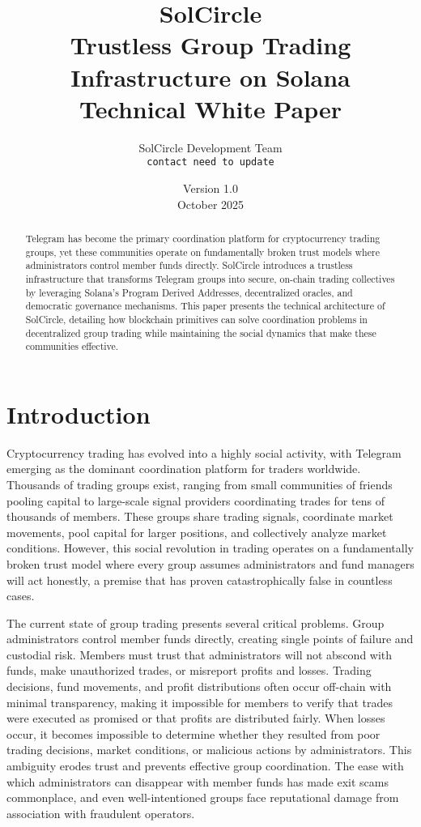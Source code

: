 \documentclass[11pt,a4paper]{article}
\title{\textbf{\Huge SolCircle} \\[0.5em] 
\Large Trustless Group Trading Infrastructure on Solana \\[1em]
\large Technical White Paper}
\author{
SolCircle Development Team \\
\texttt{contact need to update}
}
\date{Version 1.0 \\ October 2025}
\begin{document}
\maketitle

\begin{abstract}
\noindent
Telegram has become the primary coordination platform for cryptocurrency trading groups, yet these communities operate on fundamentally broken trust models where administrators control member funds directly. SolCircle introduces a trustless infrastructure that transforms Telegram groups into secure, on-chain trading collectives by leveraging Solana's Program Derived Addresses, decentralized oracles, and democratic governance mechanisms. This paper presents the technical architecture of SolCircle, detailing how blockchain primitives can solve coordination problems in decentralized group trading while maintaining the social dynamics that make these communities effective.
\end{abstract}

\newpage
\tableofcontents
\newpage

\section{Introduction}

Cryptocurrency trading has evolved into a highly social activity, with Telegram emerging as the dominant coordination platform for traders worldwide. Thousands of trading groups exist, ranging from small communities of friends pooling capital to large-scale signal providers coordinating trades for tens of thousands of members. These groups share trading signals, coordinate market movements, pool capital for larger positions, and collectively analyze market conditions. However, this social revolution in trading operates on a fundamentally broken trust model where every group assumes administrators and fund managers will act honestly, a premise that has proven catastrophically false in countless cases.

The current state of group trading presents several critical problems. Group administrators control member funds directly, creating single points of failure and custodial risk. Members must trust that administrators will not abscond with funds, make unauthorized trades, or misreport profits and losses. Trading decisions, fund movements, and profit distributions often occur off-chain with minimal transparency, making it impossible for members to verify that trades were executed as promised or that profits are distributed fairly. When losses occur, it becomes impossible to determine whether they resulted from poor trading decisions, market conditions, or malicious actions by administrators. This ambiguity erodes trust and prevents effective group coordination. The ease with which administrators can disappear with member funds has made exit scams commonplace, and even well-intentioned groups face reputational damage from association with fraudulent operators.
\end{document}
